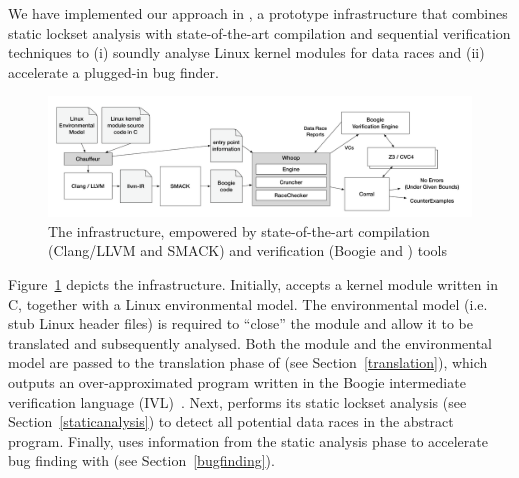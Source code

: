 We have implemented our approach in \whoop, a prototype infrastructure that combines static lockset analysis with state-of-the-art compilation and sequential verification techniques to (i) soundly analyse Linux kernel modules for data races and (ii) accelerate a plugged-in bug finder.

\begin{figure}
\centering
\includegraphics[width=.99\linewidth]{img/whoop.pdf}
\caption{The \whoop infrastructure, empowered by state-of-the-art compilation (Clang/LLVM and SMACK) and verification (Boogie and \corral) tools}
\label{fig:whoop}
\end{figure}

Figure~\ref{fig:whoop} depicts the \whoop infrastructure. Initially, \whoop accepts a kernel module written in C, together with a Linux environmental model. The environmental model (i.e. stub Linux header files) is required to ``close'' the module and allow it to be translated and subsequently analysed. Both the module and the environmental model are passed to the translation phase of \whoop (see Section~\ref{translation}), which outputs an over-approximated program written in the Boogie intermediate verification language (IVL)~\cite{deline2005boogiepl}. Next, \whoop performs its static lockset analysis (see Section~\ref{staticanalysis}) to detect all potential data races in the abstract program. Finally, \whoop uses information from the static analysis phase to accelerate bug finding with \corral (see Section~\ref{bugfinding}).